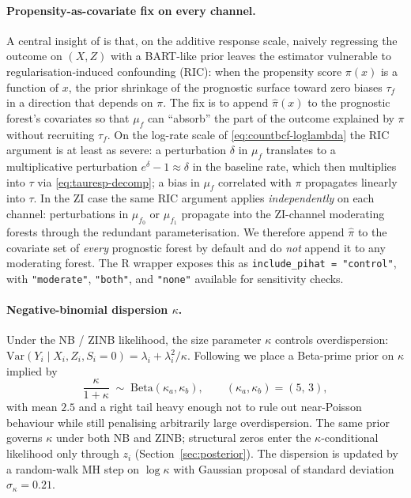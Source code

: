 \documentclass[11pt]{article}
\theoremstyle{plain}
\theoremstyle{definition}
\theoremstyle{remark}
\newcommand{\Be}{\mathrm{Beta}}
\newcommand{\Var}{\mathrm{Var}}
\newcommand{\muF}{\mu_f}
\newcommand{\tauF}{\tau_f}
\newcommand{\tauresp}{\tau}                 %
\newcommand{\pihat}{\widehat{\pi}}
\newcommand{\Si}{S_{i}}
\newcommand{\muFzero}{\mu_{f_{0}}}
\newcommand{\muFone}{\mu_{f_{1}}}
\newcommand{\zilat}{z_{i}}
\begin{document}
\paragraph{Propensity-as-covariate fix on every channel.}
A central insight of \citet{hahn2020bayesian} is that, on the
additive response scale, naively regressing the outcome on $(X, Z)$
with a BART-like prior leaves the estimator vulnerable to
regularisation-induced confounding (RIC): when the propensity score
$\pi(x)$ is a function of $x$, the prior shrinkage of the prognostic
surface toward zero biases $\tauF$ in a direction that depends on
$\pi$. The fix is to append $\pihat(x)$ to the prognostic forest's
covariates so that $\muF$ can ``absorb'' the part of the outcome
explained by $\pi$ without recruiting $\tauF$. On the log-rate scale
of \eqref{eq:countbcf-loglambda} the RIC argument is at least as
severe: a perturbation $\delta$ in $\muF$ translates to a
multiplicative perturbation $e^\delta - 1 \approx \delta$ in the
baseline rate, which then multiplies into $\tauresp$ via
\eqref{eq:tauresp-decomp}; a bias in $\muF$ correlated with $\pi$
propagates linearly into $\tauresp$. In the ZI case the same RIC
argument applies \emph{independently} on each channel: perturbations
in $\muFzero$ or $\muFone$ propagate into the ZI-channel moderating
forests through the redundant parameterisation. We therefore append
$\pihat$ to the covariate set of \emph{every} prognostic forest by
default and do \emph{not} append it to any moderating forest. The R
wrapper exposes this as \verb|include_pihat = "control"|, with
\verb|"moderate"|, \verb|"both"|, and \verb|"none"| available for
sensitivity checks.

\paragraph{Negative-binomial dispersion $\kappa$.}
Under the NB / ZINB likelihood, the size parameter $\kappa$ controls
overdispersion: $\Var(Y_i \mid X_i, Z_i, \Si = 0) = \lambda_i +
\lambda_i^2 / \kappa$. Following \citet{murray2021loglinear} we place
a Beta-prime prior on $\kappa$ implied by
\begin{equation}
  \frac{\kappa}{1 + \kappa} \;\sim\; \Be(\kappa_a, \kappa_b),
  \qquad
  (\kappa_a, \kappa_b) = (5,\, 3),
  \label{eq:kappa-prior}
\end{equation}
with mean $2.5$ and a right tail heavy enough not to rule out
near-Poisson behaviour while still penalising arbitrarily large
overdispersion. The same prior governs $\kappa$ under both NB and
ZINB; structural zeros enter the $\kappa$-conditional likelihood only
through $\zilat$ (Section~\ref{sec:posterior}). The dispersion is
updated by a random-walk MH step on $\log \kappa$ with Gaussian
proposal of standard deviation $\sigma_\kappa = 0.21$.
\end{document}
